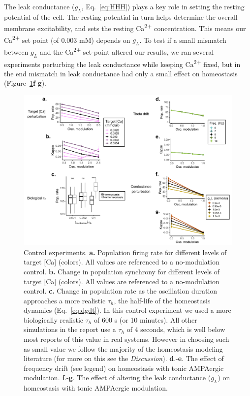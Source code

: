 \documentclass{article}
\begin{document}
The leak conductance ($g_L$, Eq.~\ref{eq:HHH}) plays a key role in setting the resting potential of the cell. The resting potential in turn helps determine the overall membrane excitability, and sets the resting Ca\textsuperscript{2+} concentration. This means our Ca\textsuperscript{2+} set point (of 0.003 mM) depends on $g_L$. To test if a small mismatch between $g_L$ and the Ca\textsuperscript{2+} set-point altered our results, we ran several experiments perturbing the leak conductance while keeping Ca\textsuperscript{2+} fixed, but in the end mismatch in leak conductance had only a small effect on homeostasis (Figure~\ref{fig:f5}\textbf{f}-\textbf{g}).

\begin{figure}
\centering
\includegraphics[width=1\textwidth]{fig5.png}
\caption{\label{fig:f5}
    Control experiments.
    \textbf{a.} Population firing rate for different levels of target [Ca] (colors). All values are referenced to a no-modulation control.
    \textbf{b.} Change in population synchrony for different levels of target [Ca] (colors). All values are referenced to a no-modulation control.
    \textbf{c.} Change in population rate as the oscillation duration approaches a more realistic $\tau_h$, the half-life of the homeostasis dynamics (Eq.~\ref{eq:dgdt}). In this control experiment we used a more biologically realistic $\tau_h$ of 600 s (or 10 minutes). All other simulations in the report use a $\tau_h$ of 4 seconds, which is well below most reports of this value in real systems. However in choosing such as small value we follow the majority of the homeostasis modeling literature (for more on this see the \textit{Discussion}).
    \textbf{d}.-\textbf{e}. The effect of frequency drift (see legend) on homeostasis with tonic AMPAergic modulation.
    \textbf{f}.-\textbf{g}. The effect of altering the leak conductance ($g_L$) on homeostasis with tonic AMPAergic modulation.
}
\end{figure}
\end{document}

